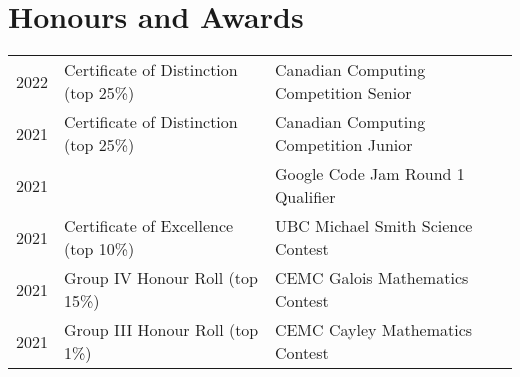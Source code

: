 
\section{Honours and Awards} 
\begin{tabular}{rll}
2022 & Certificate of Distinction (top 25\%) & Canadian Computing Competition Senior \\ 
2021 & Certificate of Distinction (top 25\%) & Canadian Computing Competition Junior \\ 
2021 & & Google Code Jam Round 1 Qualifier \\   
2021 & Certificate of Excellence (top 10\%) & UBC Michael Smith Science Contest \\ 
2021 & Group IV Honour Roll (top 15\%) & CEMC Galois Mathematics Contest \\ 
2021 & Group III Honour Roll (top 1\%) & CEMC Cayley Mathematics Contest \\
\end{tabular}
\sectionsep